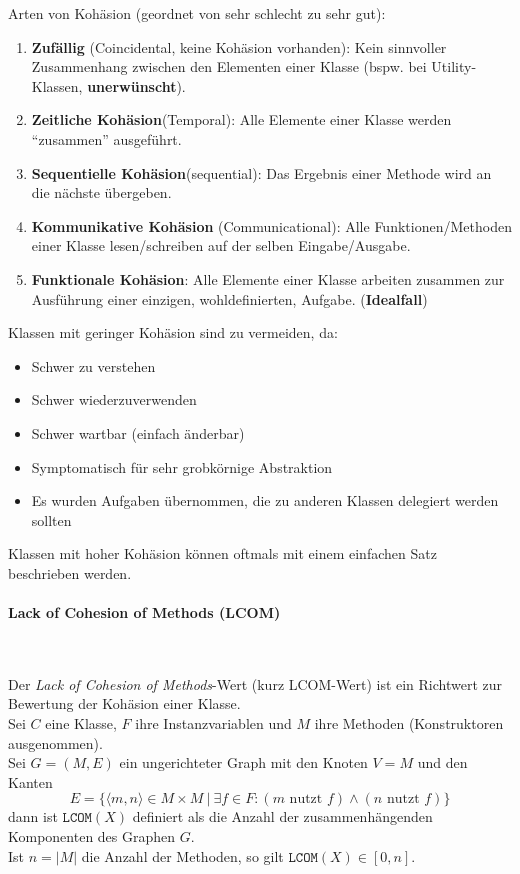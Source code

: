 \documentclass[ngerman,color=3b]{tuda_summary}
\begin{document}
Arten von Kohäsion (geordnet von sehr schlecht zu sehr gut):
\begin{enumerate}
    \item \textbf{Zufällig} (Coincidental, keine Kohäsion vorhanden): Kein sinnvoller Zusammenhang zwischen den Elementen einer Klasse (bspw. bei Utility-Klassen, \textbf{unerwünscht}).
    \item \textbf{Zeitliche Kohäsion}(Temporal): Alle Elemente einer Klasse werden \enquote{zusammen} ausgeführt.
    \item \textbf{Sequentielle Kohäsion}(sequential): Das Ergebnis einer Methode wird an die nächste übergeben.
    \item \textbf{Kommunikative Kohäsion} (Communicational): Alle Funktionen/Methoden einer Klasse lesen/schreiben auf der selben Eingabe/Ausgabe.
    \item \textbf{Funktionale Kohäsion}: Alle Elemente einer Klasse arbeiten zusammen zur Ausführung einer einzigen, wohldefinierten, Aufgabe. (\textbf{Idealfall})
\end{enumerate}

Klassen mit geringer Kohäsion sind zu vermeiden, da:
\begin{itemize}
    \item Schwer zu verstehen
    \item Schwer wiederzuverwenden
    \item Schwer wartbar (einfach änderbar)
    \item Symptomatisch für sehr grobkörnige Abstraktion
    \item Es wurden Aufgaben übernommen, die zu anderen Klassen delegiert werden sollten
\end{itemize}
Klassen mit hoher Kohäsion können oftmals mit einem einfachen Satz beschrieben werden.

\paragraph{Lack of Cohesion of Methods (LCOM)}\mbox{}\\
\begin{definition}
    Der \textit{Lack of Cohesion of Methods}-Wert (kurz LCOM-Wert) ist ein Richtwert zur Bewertung der Kohäsion einer Klasse.\\
    Sei $ C $ eine Klasse, $ F $ ihre Instanzvariablen und $ M $ ihre Methoden (Konstruktoren ausgenommen).\\
    Sei $ G = (M, E) $ ein ungerichteter Graph mit den Knoten $ V = M $ und den Kanten
    \[ E = \{ \langle m, n\rangle \in M \times M~|~\exists f \in F : (m \text{ nutzt } f) \land (n \text{ nutzt } f) \} \]
    dann ist $ \texttt{LCOM}(X) $ definiert als die Anzahl der zusammenhängenden Komponenten des Graphen $ G $.\\
    Ist $ n=\vert M \vert $ die Anzahl der Methoden, so gilt $ \texttt{LCOM}(X) \in [0, n] $.
\end{definition}
\end{document}

